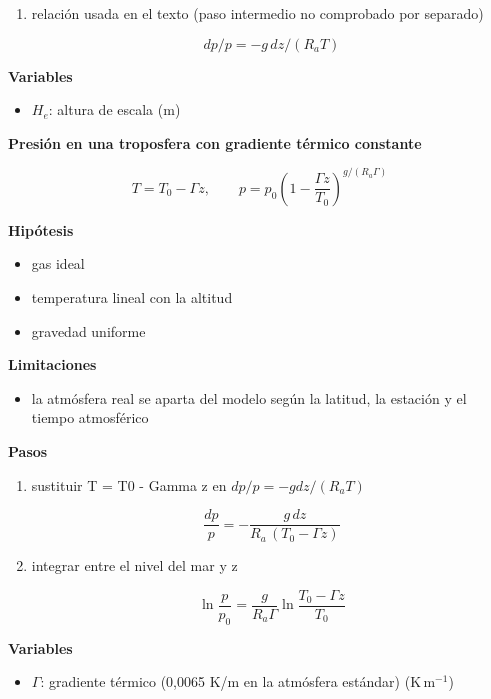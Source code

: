 \documentclass[10pt,openany]{book}
\begin{document}
\begin{tcolorbox}[title={Desarrollos del modelo}, studiumdef, breakable]
\begin{enumerate}
\[
\rho = p/(R_a T)
\]
\item
relación usada en el texto (paso intermedio no comprobado por separado)

\[
dp/p = -g\,dz/(R_a T)
\]
\end{enumerate}

\noindent\textbf{Variables}
\begin{itemize}
\item $H_{e}$: altura de escala ($\mathrm{m}$)
\end{itemize}



\noindent\textbf{Presión en una troposfera con gradiente térmico constante}

\[
T = T_0 - \Gamma z,\qquad p = p_0\left(1 - \frac{\Gamma z}{T_0}\right)^{g/(R_a\Gamma)}
\]

\noindent\textbf{Hipótesis}
\begin{itemize}
\item gas ideal
\item temperatura lineal con la altitud
\item gravedad uniforme
\end{itemize}

\noindent\textbf{Limitaciones}
\begin{itemize}
\item la atmósfera real se aparta del modelo según la latitud, la estación y el tiempo atmosférico
\end{itemize}

\noindent\textbf{Pasos}
\begin{enumerate}
\item
sustituir T = T0 - Gamma z en \(dp/p = -g dz/(R_a T)\)

\[
\frac{dp}{p} = -\frac{g\,dz}{R_a\,(T_0 - \Gamma z)}
\]
\item
integrar entre el nivel del mar y z

\[
\ln\frac{p}{p_0} = \frac{g}{R_a\Gamma}\ln\frac{T_0 - \Gamma z}{T_0}
\]
\end{enumerate}

\noindent\textbf{Variables}
\begin{itemize}
\item $\Gamma$: gradiente térmico (0,0065 K/m en la atmósfera estándar) ($\mathrm{K}\,\mathrm{m}^{-1}$)
\end{itemize}


\end{tcolorbox}
\end{document}
